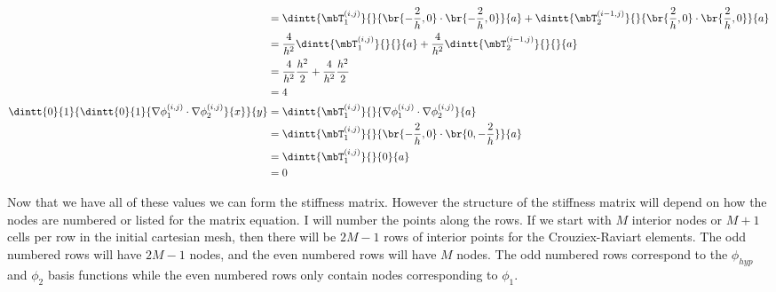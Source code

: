 \documentclass[11pt, titlepage]{article}
\begin{document}
\begin{enumerate}
\begin{enumerate}
\begin{align*}
          &= \dintt{\mbT^{(i, j)}_1}{}{\br{-\frac{2}{h}, 0} \cdot \br{-\frac{2}{h}, 0}}{a}
            + \dintt{\mbT^{(i-1, j)}_2}{}{\br{\frac{2}{h}, 0} \cdot \br{\frac{2}{h}, 0}}{a}\\
          &= \frac{4}{h^2}\dintt{\mbT^{(i, j)}_1}{}{}{a} + \frac{4}{h^2}\dintt{\mbT^{(i-1, j)}_2}{}{}{a}\\
          &= \frac{4}{h^2}\frac{h^2}{2} + \frac{4}{h^2} \frac{h^2}{2}\\
          &= 4 \\
          \dintt{0}{1}{\dintt{0}{1}{\nabla \phi^{(i, j)}_{1} \cdot \nabla \phi^{(i, j)}_{2}}{x}}{y}
          &= \dintt{\mbT^{(i, j)}_1}{}{\nabla \phi^{(i, j)}_{1} \cdot \nabla \phi^{(i, j)}_{2}}{a}\\
          &= \dintt{\mbT^{(i, j)}_1}{}{\br{-\frac{2}{h}, 0} \cdot \br{0, -\frac{2}{h}}}{a}\\
          &= \dintt{\mbT^{(i, j)}_1}{}{0}{a}\\
          &= 0
        \end{align*}

        Now that we have all of these values we can form the stiffness matrix.
        However the structure of the stiffness matrix will depend on how the
        nodes are numbered or listed for the matrix equation.
        I will number the points along the rows.
        If we start with $M$ interior nodes or $M+1$ cells per row in the
        initial cartesian mesh, then there will be $2M - 1$ rows of interior
        points for the Crouziex-Raviart elements.
        The odd numbered rows will have $2M - 1$ nodes, and the even numbered
        rows will have $M$ nodes.
        The odd numbered rows correspond to the $\phi_{hyp}$ and $\phi_2$ basis
        functions while the even numbered rows only contain nodes corresponding
        to $\phi_1$.


\end{enumerate}
\end{enumerate}
\end{document}
